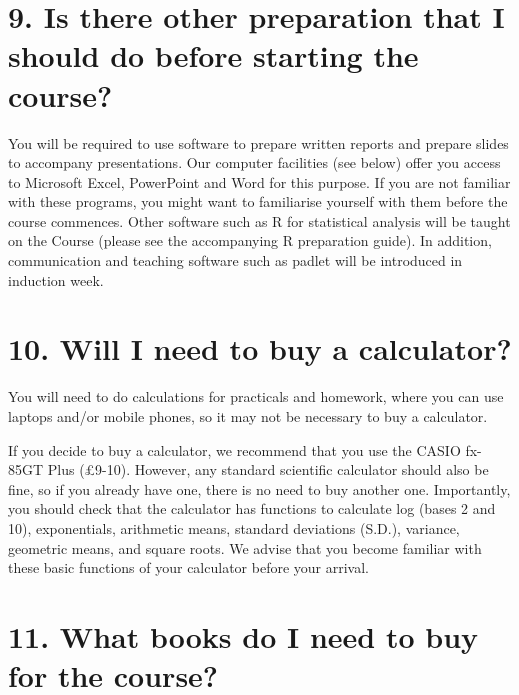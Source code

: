 \documentclass[
]{book}
\begin{document}
\section*{9. Is there other preparation that I should do before starting the course?}\label{is-there-other-preparation-that-i-should-do-before-starting-the-course}

You will be required to use software to prepare written reports and prepare slides to accompany presentations. Our computer facilities (see below) offer you access to Microsoft Excel, PowerPoint and Word for this purpose. If you are not familiar with these programs, you might want to familiarise yourself with them before the course commences. Other software such as R for statistical analysis will be taught on the Course (please see the accompanying R preparation guide). In addition, communication and teaching software such as padlet will be introduced in induction week.

\section*{10. Will I need to buy a calculator?}\label{will-i-need-to-buy-a-calculator}

You will need to do calculations for practicals and homework, where you can use laptops and/or mobile phones, so it may not be necessary to buy a calculator.

If you decide to buy a calculator, we recommend that you use the CASIO fx-85GT Plus (£9-10). However, any standard scientific calculator should also be fine, so if you already have one, there is no need to buy another one. Importantly, you should check that the calculator has functions to calculate log (bases 2 and 10), exponentials, arithmetic means, standard deviations (S.D.), variance, geometric means, and square roots. We advise that you become familiar with these basic functions of your calculator before your arrival.

\section*{11. What books do I need to buy for the course?}\label{what-books-do-i-need-to-buy-for-the-course}
\end{document}
